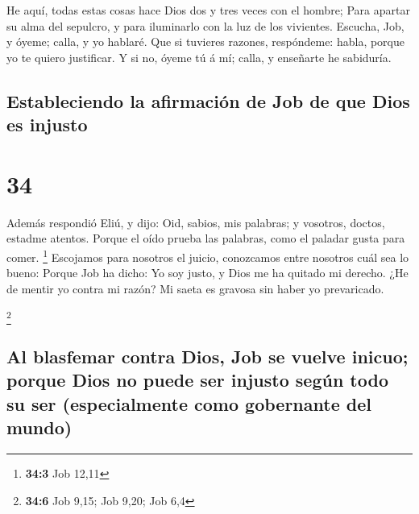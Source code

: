  He aquí, todas estas cosas hace Dios dos y tres veces
con el hombre;  Para apartar su alma del sepulcro, y para
iluminarlo con la luz de los vivientes.  Escucha, Job, y
óyeme; calla, y yo hablaré.  Que si tuvieres razones,
respóndeme: habla, porque yo te quiero justificar.  Y si
no, óyeme tú á mí; calla, y enseñarte he sabiduría.

\hypertarget{estableciendo-la-afirmaciuxf3n-de-job-de-que-dios-es-injusto}{%
\subsection{Estableciendo la afirmación de Job de que Dios es
injusto}\label{estableciendo-la-afirmaciuxf3n-de-job-de-que-dios-es-injusto}}

\hypertarget{section-33}{%
\section{34}\label{section-33}}

 Además respondió Eliú, y dijo:  Oid,
sabios, mis palabras; y vosotros, doctos, estadme atentos.
 Porque el oído prueba las palabras, como el paladar gusta
para comer. \footnote{\textbf{34:3} Job 12,11}  Escojamos
para nosotros el juicio, conozcamos entre nosotros cuál sea lo bueno:
 Porque Job ha dicho: Yo soy justo, y Dios me ha quitado
mi derecho.  ¿He de mentir yo contra mi razón? Mi saeta es
gravosa sin haber yo prevaricado.

\footnote{\textbf{34:6} Job 9,15; Job 9,20; Job 6,4}

\hypertarget{al-blasfemar-contra-dios-job-se-vuelve-inicuo-porque-dios-no-puede-ser-injusto-seguxfan-todo-su-ser-especialmente-como-gobernante-del-mundo}{%
\subsection{Al blasfemar contra Dios, Job se vuelve inicuo; porque Dios
no puede ser injusto según todo su ser (especialmente como gobernante
del
mundo)}\label{al-blasfemar-contra-dios-job-se-vuelve-inicuo-porque-dios-no-puede-ser-injusto-seguxfan-todo-su-ser-especialmente-como-gobernante-del-mundo}}

